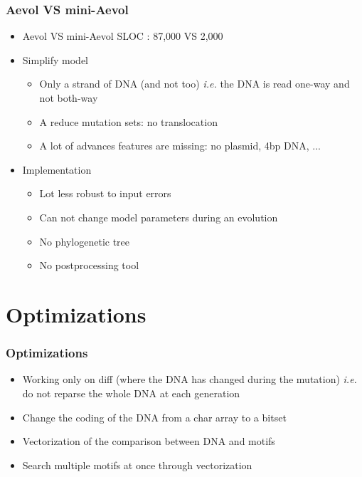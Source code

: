\documentclass{beamer}
\begin{document}
\begin{frame}
 \frametitle{Aevol VS mini-Aevol}
 \begin{itemize}
  \item Aevol VS mini-Aevol SLOC : 87,000 VS 2,000 
  \vfill
  \item Simplify model
  \begin{itemize}
  \item Only a strand of DNA (and not too) \textit{i.e.} the DNA is read one-way and not both-way
  \item A reduce mutation sets: no translocation
  \item A lot of advances features are missing: no plasmid, 4bp DNA, ...
  \end{itemize}
  \vfill
  \item Implementation
  \begin{itemize}
   \item Lot less robust to input errors
   \item Can not change model parameters during an evolution
   \item No phylogenetic tree
   \item No postprocessing tool
  \end{itemize}
 \end{itemize}
\end{frame}


%  

\section{Optimizations}
\begin{frame}
 \frametitle{Optimizations}
 \begin{itemize}
  \item Working only on diff (where the DNA has changed during the mutation) \textit{i.e.} do not reparse the whole DNA at each generation
  \item Change the coding of the DNA from a char array to a bitset
  \item Vectorization of the comparison between DNA and motifs
  \item Search multiple motifs at once through vectorization
 \end{itemize}
\end{frame}
\end{document}
